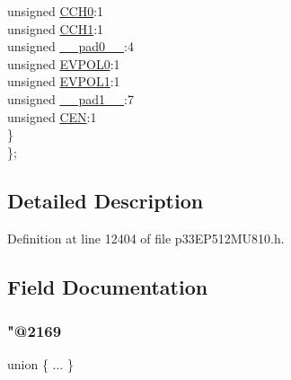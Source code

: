 \begin{DoxyCompactItemize}
\begin{tabbing}
\>\>unsigned \hyperlink{structtag_c_m2_c_o_n_b_i_t_s_a9dad61251c4da1feccdccad790f76a62}{CCH0}:1\\
\>\>unsigned \hyperlink{structtag_c_m2_c_o_n_b_i_t_s_a7753603d75b7b22f224e8bd9325a0d15}{CCH1}:1\\
\>\>unsigned \hyperlink{structtag_c_m2_c_o_n_b_i_t_s_adf71f3d8410c1f1dbbc96680a92c49af}{\_\_pad0\_\_}:4\\
\>\>unsigned \hyperlink{structtag_c_m2_c_o_n_b_i_t_s_ab8a5977706a1608b0e9a1a91b9d3b3e3}{EVPOL0}:1\\
\>\>unsigned \hyperlink{structtag_c_m2_c_o_n_b_i_t_s_a0254aea1902c8c590f6753fefd1d8875}{EVPOL1}:1\\
\>\>unsigned \hyperlink{structtag_c_m2_c_o_n_b_i_t_s_acaf2d0924a107ec6e8d2e31febaf66f9}{\_\_pad1\_\_}:7\\
\>\>unsigned \hyperlink{structtag_c_m2_c_o_n_b_i_t_s_ac2fcf3da30303e5fdf269436a0fa4505}{CEN}:1\\
\>\} \\
\}; \\

\end{tabbing}\end{DoxyCompactItemize}


\subsection{Detailed Description}


Definition at line 12404 of file p33\+E\+P512\+M\+U810.\+h.



\subsection{Field Documentation}
\mbox{\label{structtag_c_m2_c_o_n_b_i_t_s_af8b2ab46abeaaa141215a95d761c52c5}} 
\subsubsection{\texorpdfstring{"@2169}{@2169}}
{\footnotesize\ttfamily union \{ ... \} }

\mbox{\label{structtag_c_m2_c_o_n_b_i_t_s_adf71f3d8410c1f1dbbc96680a92c49af}} 
